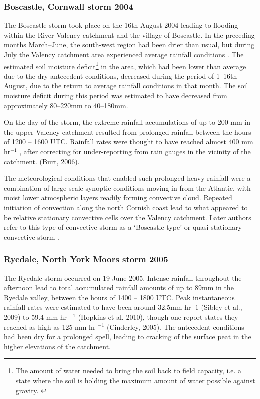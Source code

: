 \subsubsection{Boscastle, Cornwall storm 2004}
The Boscastle storm took place on the 16th August 2004 leading to flooding within the River Valency catchment and the village of Boscastle. In the preceding months March--June, the south-west region had been drier than usual, but during July the Valency catchment area experienced average rainfall conditions \citep{golding2005boscastle}. The estimated soil moisture deficit\footnote{The amount of water needed to bring the soil back to field capacity, i.e. a state where the soil is holding the maximum amount of water possible against gravity. \citep{beven2011rainfall}} in the area, which had been lower than average due to the dry antecedent conditions, decreased during the period of 1--16th August, due to the return to average rainfall conditions in that month. The soil moisture deficit during this period was estimated to have decreased from approximately 80--220mm to 40--180mm.

On the day of the storm, the extreme rainfall accumulations of up to 200 mm in the upper Valency catchment resulted from prolonged rainfall between the hours of 1200 -- 1600 UTC. Rainfall rates were thought to have reached almost 400 mm hr\(^{-1}\) \citep{Golding2006}, after correcting for under-reporting from rain gauges in the vicinity of the catchment. (Burt, 2006).

The meteorological conditions that enabled such prolonged heavy rainfall were a combination of large-scale synoptic conditions moving in from the Atlantic, with moist lower atmospheric layers readily forming convective cloud. Repeated initiation of convection along the north Cornish coast lead to what appeared to be relative stationary convective cells over the Valency catchment. Later authors refer to this type of convective storm as a `Boscastle-type' or quasi-stationary convective storm \citep{warren2014boscastle}.



\subsubsection{Ryedale, North York Moors storm 2005}
The Ryedale storm occurred on 19 June 2005. Intense rainfall throughout the afternoon lead to total accumulated rainfall amounts of up to 89mm in the Ryedale valley, between the hours of 1400 -- 1800 UTC. Peak instantaneous rainfall rates were estimated to have been around 32.5mm hr\(^-1\) (Sibley et al., 2009) to 59.4 mm hr \(^{-1}\) (Hopkins et al. 2010), though one report states they reached as high as 125 mm hr \(^{-1}\) (Cinderley, 2005). The antecedent conditions had been dry for a prolonged spell, leading to cracking of the surface peat in the higher elevations of the catchment.

